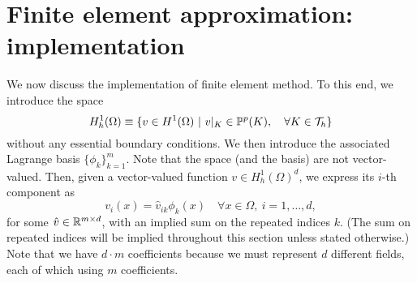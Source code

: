 \section{Finite element approximation: implementation}
We now discuss the implementation of finite element method. To this end, we introduce the space
\begin{equation*}
  H^1_h(\Omega) \equiv \{ v \in H^1(\Omega) \ | \ v|_K \in \mathbb{P}^p(K) , \quad \forall K \in \mathcal{T}_h \} 
\end{equation*}
without any essential boundary conditions.  We then introduce the associated Lagrange basis $\{ \phi_k \}_{k=1}^m$.  Note that the space (and the basis) are not vector-valued. Then, given a vector-valued function $v \in H^1_h(\Omega)^d$, we express its $i$-th component as
\begin{equation*}
  v_i(x) = \hat v_{ik} \phi_k(x) \quad \forall x \in \Omega, \ i = 1,\dots, d,
\end{equation*}
for some $\hat v \in \mathbb{R}^{m \times d}$, with an implied sum on the repeated indices $k$. (The sum on repeated indices will be implied throughout this section unless stated otherwise.)  Note that we have $d\cdot m$ coefficients because we must represent $d$ different fields, each of which using $m$ coefficients.

